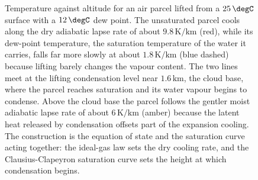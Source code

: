 \begin{figure}[htbp]
\centering
{}
\caption[Adiabatic lapse rate and cloud base]{Temperature against altitude
for an air parcel lifted from a $25\,\degC$ surface with a $12\,\degC$ dew
point. The unsaturated parcel cools along the dry adiabatic lapse rate of
about $9.8\,\text{K/km}$ (red), while its dew-point temperature, the
saturation temperature of the water it carries, falls far more slowly at
about $1.8\,\text{K/km}$ (blue dashed) because lifting barely changes the
vapour content. The two lines meet at the lifting condensation level near
$1.6\,\text{km}$, the cloud base, where the parcel reaches saturation and
its water vapour begins to condense. Above the cloud base the parcel
follows the gentler moist adiabatic lapse rate of about $6\,\text{K/km}$
(amber) because the latent heat released by condensation offsets part of
the expansion cooling. The construction is the equation of state and the
saturation curve acting together: the ideal-gas law sets the dry cooling
rate, and the Clausius-Clapeyron saturation curve sets the height at which
condensation begins.}
\label{fig:vol04ch02:lapse-rate-cloud-base}
\end{figure}
